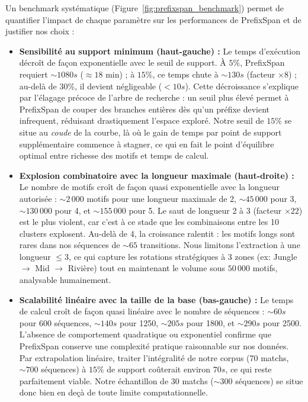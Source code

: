 \documentclass[11pt, a4paper]{article}
\begin{document}
Un benchmark systématique (Figure~\ref{fig:prefixspan_benchmark}) permet de quantifier l'impact de chaque paramètre sur les performances de PrefixSpan et de justifier nos choix :

\begin{itemize}
    \item \textbf{Sensibilité au support minimum (haut-gauche) :} Le temps d'exécution décroît de façon exponentielle avec le seuil de support. À $5\%$, PrefixSpan requiert $\sim 1080s$ ($\approx 18$ min) ; à $15\%$, ce temps chute à $\sim 130s$ (facteur $\times 8$) ; au-delà de $30\%$, il devient négligeable ($< 10s$). Cette décroissance s'explique par l'élagage précoce de l'arbre de recherche : un seuil plus élevé permet à PrefixSpan de couper des branches entières dès qu'un préfixe devient infrequent, réduisant drastiquement l'espace exploré. Notre seuil de $15\%$ se situe au \textit{coude} de la courbe, là où le gain de temps par point de support supplémentaire commence à stagner, ce qui en fait le point d'équilibre optimal entre richesse des motifs et temps de calcul.

    \item \textbf{Explosion combinatoire avec la longueur maximale (haut-droite) :} Le nombre de motifs croît de façon quasi exponentielle avec la longueur autorisée : $\sim 2\,000$ motifs pour une longueur maximale de 2, $\sim 45\,000$ pour 3, $\sim 130\,000$ pour 4, et $\sim 155\,000$ pour 5. Le saut de longueur 2 à 3 (facteur $\times 22$) est le plus violent, car c'est à ce stade que les combinaisons entre les 10 clusters explosent. Au-delà de 4, la croissance ralentit : les motifs longs sont rares dans nos séquences de $\sim 65$ transitions. Nous limitons l'extraction à une longueur $\le 3$, ce qui capture les rotations stratégiques à 3 zones (ex: Jungle $\rightarrow$ Mid $\rightarrow$ Rivière) tout en maintenant le volume sous $50\,000$ motifs, analysable humainement.

    \item \textbf{Scalabilité linéaire avec la taille de la base (bas-gauche) :} Le temps de calcul croît de façon quasi linéaire avec le nombre de séquences : $\sim 60s$ pour 600 séquences, $\sim 140s$ pour 1250, $\sim 205s$ pour 1800, et $\sim 290s$ pour 2500. L'absence de comportement quadratique ou exponentiel confirme que PrefixSpan conserve une complexité pratique raisonnable sur nos données. Par extrapolation linéaire, traiter l'intégralité de notre corpus (70 matchs, $\sim 700$ séquences) à $15\%$ de support coûterait environ $70s$, ce qui reste parfaitement viable. Notre échantillon de 30 matchs ($\sim 300$ séquences) se situe donc bien en deçà de toute limite computationnelle.


\end{itemize}
\end{document}
